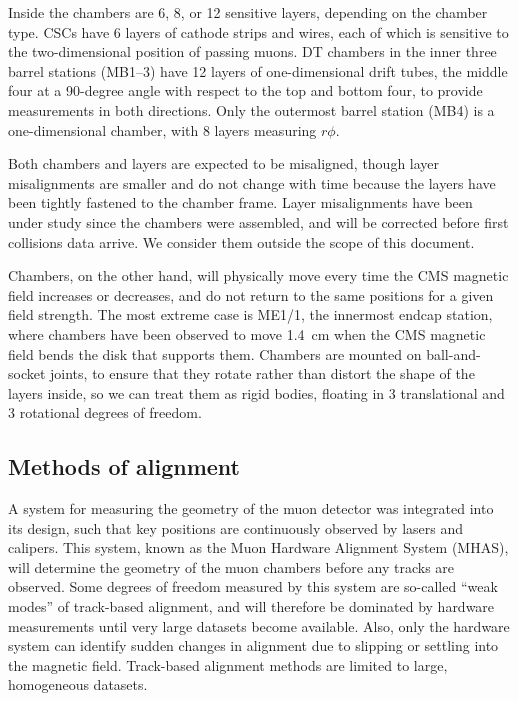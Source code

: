 \documentclass[12pt]{article}
\begin{document}
Inside the chambers are 6, 8, or 12 sensitive layers, depending on the
chamber type.  CSCs have 6 layers of cathode strips and wires, each of
which is sensitive to the two-dimensional position of passing muons.
DT chambers in the inner three barrel stations (MB1--3) have 12 layers
of one-dimensional drift tubes, the middle four at a 90-degree angle
with respect to the top and bottom four, to provide measurements in
both directions.  Only the outermost barrel station (MB4) is a
one-dimensional chamber, with 8 layers measuring $r\phi$.

Both chambers and layers are expected to be misaligned, though layer
misalignments are smaller and do not change with time because the
layers have been tightly fastened to the chamber frame.  Layer
misalignments have been under study since the chambers were assembled,
and will be corrected before first collisions data arrive.  We
consider them outside the scope of this document.

Chambers, on the other hand, will physically move every time the CMS
magnetic field increases or decreases, and do not return to the same
positions for a given field strength.  The most extreme case is ME1/1,
the innermost endcap station, where chambers have been observed to
move 1.4~cm when the CMS magnetic field bends the disk that supports
them.  Chambers are mounted on ball-and-socket joints, to ensure that
they rotate rather than distort the shape of the layers inside, so we
can treat them as rigid bodies, floating in 3 translational and 3
rotational degrees of freedom.

\subsection{Methods of alignment}

A system for measuring the geometry of the muon detector was
integrated into its design, such that key positions are continuously
observed by lasers and calipers.  This system, known as the Muon
Hardware Alignment System (MHAS), will determine the geometry of the
muon chambers before any tracks are observed.  Some degrees of freedom
measured by this system are so-called ``weak modes'' of track-based
alignment, and will therefore be dominated by hardware measurements
until very large datasets become available.  Also, only
the hardware system can identify sudden changes in alignment due to
slipping or settling into the magnetic field.  Track-based alignment
methods are limited to large, homogeneous datasets.
\end{document}
